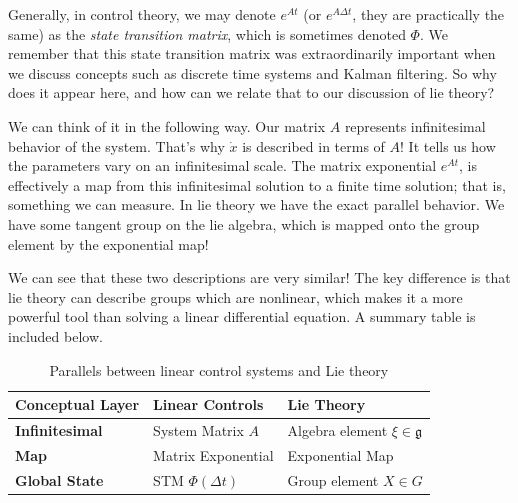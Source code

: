     Generally, in control theory, we may denote $e^{At}$ (or $e^{A\Delta t}$, they are practically the same) as the \textit{state transition matrix}, which is sometimes denoted $\Phi$. We remember that this state transition matrix was extraordinarily important when we discuss concepts such as discrete time systems and  Kalman filtering. So why does it appear here, and how can we relate that to our discussion of \gls{lie theory}?

    We can think of it in the following way. Our matrix $A$ represents infinitesimal behavior of the system. That's why $\dot{x}$ is described in terms of $A$! It tells us how the parameters vary on an infinitesimal scale. The matrix exponential $e^{At}$, is effectively a map from this infinitesimal solution to a finite time solution; that is, something we can measure. In \gls{lie theory} we have the exact parallel behavior. We have some tangent group on the \gls{lie algebra}, which is mapped onto the group element by the exponential map!

    We can see that these two descriptions are very similar! The key difference is that \gls {lie theory} can describe groups which are nonlinear, which makes it a more powerful tool than solving a linear differential equation. A summary table is included below.

\begin{table}[ht]
    \centering
    \caption{Parallels between linear control systems and Lie theory}
    \label{tab:control_lie_parallel}
    \begin{tabular}{lll}
        \toprule
        \textbf{Conceptual Layer} & \textbf{Linear Controls}& \textbf{Lie Theory}\\ \midrule
        \textbf{Infinitesimal}& System Matrix $A$& Algebra element $\xi \in \mathfrak{g}$\\
        \textbf{Map}& Matrix Exponential& Exponential Map\\
        \textbf{Global State}& STM $\Phi(\Delta t)$& Group element $X \in G$\\ \bottomrule
    \end{tabular}
\end{table}

